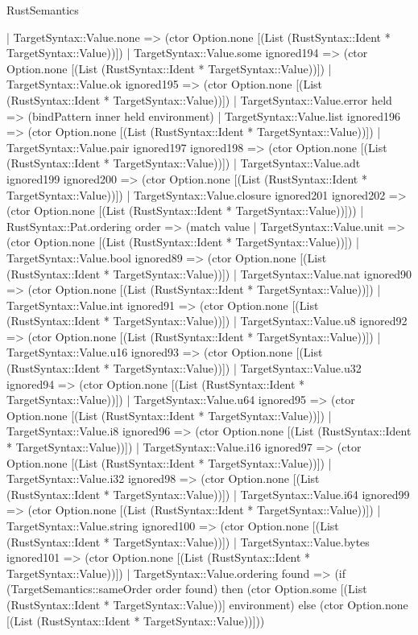 \begin{lexlean}{RustSemantics}
\begin{semanticmodule}
{      | TargetSyntax::Value.none => (ctor Option.none [(List (RustSyntax::Ident * TargetSyntax::Value))])
      | TargetSyntax::Value.some ignored194 => (ctor Option.none [(List (RustSyntax::Ident * TargetSyntax::Value))])
      | TargetSyntax::Value.ok ignored195 => (ctor Option.none [(List (RustSyntax::Ident * TargetSyntax::Value))])
      | TargetSyntax::Value.error held => (bindPattern inner held environment)
      | TargetSyntax::Value.list ignored196 => (ctor Option.none [(List (RustSyntax::Ident * TargetSyntax::Value))])
      | TargetSyntax::Value.pair ignored197 ignored198 => (ctor Option.none [(List (RustSyntax::Ident * TargetSyntax::Value))])
      | TargetSyntax::Value.adt ignored199 ignored200 => (ctor Option.none [(List (RustSyntax::Ident * TargetSyntax::Value))])
      | TargetSyntax::Value.closure ignored201 ignored202 => (ctor Option.none [(List (RustSyntax::Ident * TargetSyntax::Value))]))
    | RustSyntax::Pat.ordering order => (match value
      | TargetSyntax::Value.unit => (ctor Option.none [(List (RustSyntax::Ident * TargetSyntax::Value))])
      | TargetSyntax::Value.bool ignored89 => (ctor Option.none [(List (RustSyntax::Ident * TargetSyntax::Value))])
      | TargetSyntax::Value.nat ignored90 => (ctor Option.none [(List (RustSyntax::Ident * TargetSyntax::Value))])
      | TargetSyntax::Value.int ignored91 => (ctor Option.none [(List (RustSyntax::Ident * TargetSyntax::Value))])
      | TargetSyntax::Value.u8 ignored92 => (ctor Option.none [(List (RustSyntax::Ident * TargetSyntax::Value))])
      | TargetSyntax::Value.u16 ignored93 => (ctor Option.none [(List (RustSyntax::Ident * TargetSyntax::Value))])
      | TargetSyntax::Value.u32 ignored94 => (ctor Option.none [(List (RustSyntax::Ident * TargetSyntax::Value))])
      | TargetSyntax::Value.u64 ignored95 => (ctor Option.none [(List (RustSyntax::Ident * TargetSyntax::Value))])
      | TargetSyntax::Value.i8 ignored96 => (ctor Option.none [(List (RustSyntax::Ident * TargetSyntax::Value))])
      | TargetSyntax::Value.i16 ignored97 => (ctor Option.none [(List (RustSyntax::Ident * TargetSyntax::Value))])
      | TargetSyntax::Value.i32 ignored98 => (ctor Option.none [(List (RustSyntax::Ident * TargetSyntax::Value))])
      | TargetSyntax::Value.i64 ignored99 => (ctor Option.none [(List (RustSyntax::Ident * TargetSyntax::Value))])
      | TargetSyntax::Value.string ignored100 => (ctor Option.none [(List (RustSyntax::Ident * TargetSyntax::Value))])
      | TargetSyntax::Value.bytes ignored101 => (ctor Option.none [(List (RustSyntax::Ident * TargetSyntax::Value))])
      | TargetSyntax::Value.ordering found => (if (TargetSemantics::sameOrder order found) then (ctor Option.some [(List (RustSyntax::Ident * TargetSyntax::Value))] environment) else (ctor Option.none [(List (RustSyntax::Ident * TargetSyntax::Value))]))
}
\end{semanticmodule}
\end{lexlean}
